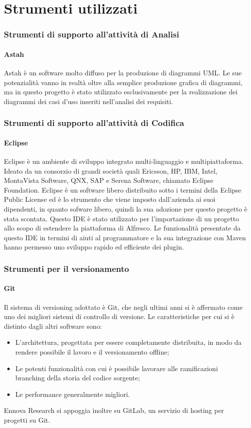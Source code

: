 \section{Strumenti utilizzati}
\subsubsection{Strumenti di supporto all’attività di Analisi}
\paragraph{Astah}
Astah è un software molto diffuso per la produzione di diagrammi UML.
Le sue potenzialità vanno in realtà oltre alla semplice produzione grafica di diagrammi,
ma in questo progetto è stato utilizzato esclusivamente per la realizzazione dei
diagrammi dei casi d’uso inseriti nell’analisi dei requisiti.
\subsubsection{Strumenti di supporto all’attività di Codifica}
\paragraph{Eclipse}
Eclipse è un ambiente di sviluppo integrato multi-linguaggio e multipiattaforma. Ideato da un consorzio di grandi società quali Ericsson, HP, IBM, Intel, MontaVista Software, QNX, SAP e Serena Software, chiamato Eclipse Foundation.
Eclipse è un software libero distribuito sotto i termini della Eclipse Public License ed è lo strumento che viene imposto dall'azienda ai suoi dipendenti, in quanto sofware libero, quindi la sua adozione per questo progetto è stata scontata.
Questo IDE è stato utilizzato per l’importazione
di un progetto allo scopo di estendere la piattaforma di Alfresco. Le funzionalità
presentate da questo IDE in termini di aiuti al programmatore e la sua integrazione con Maven hanno permesso uno sviluppo rapido ed efficiente dei plugin.
\subsubsection{Strumenti per il versionamento}
\paragraph{Git}
Il sistema di versioning adottato è Git, che negli ultimi anni si è affermato come uno
dei migliori sistemi di controllo di versione.
Le caratteristiche per cui si è distinto dagli altri software sono:
\begin{itemize}
\item L’architettura, progettata per essere completamente distribuita, in modo da
rendere possibile il lavoro e il versionamento offline;
\item Le potenti funzionalità con cui è possibile lavorare alle ramificazioni branching
della storia del codice sorgente;
\item Le performance generalmente migliori.
\end{itemize}
Ennova Research si appoggia inoltre su GitLab, un servizio di hosting per progetti
su Git.
